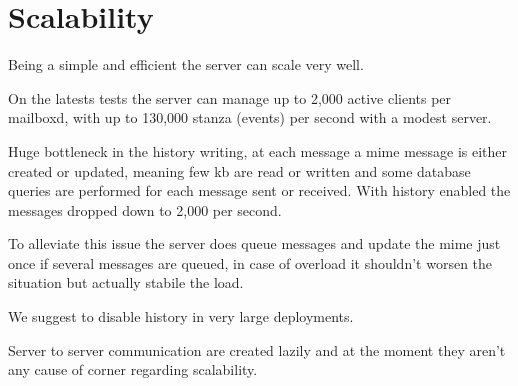 \chapter{Scalability}

Being a simple and efficient the server can scale very well.

On the latests tests the server can manage up to 2,000 active clients per mailboxd, with up to 130,000 stanza (events)
 per second with a modest server. %

Huge bottleneck in the history writing, at each message a mime message is either created or updated, meaning few kb are
 read or written and some database queries are performed for each message sent or received. With history enabled the
 messages dropped down to 2,000 per second.

To alleviate this issue the server does queue messages and update the mime just once if several messages are queued,
 in case of overload it shouldn't worsen the situation but actually stabile the load.

We suggest to disable history in very large deployments.

Server to server communication are created lazily and at the moment they aren't any cause of corner regarding scalability.
